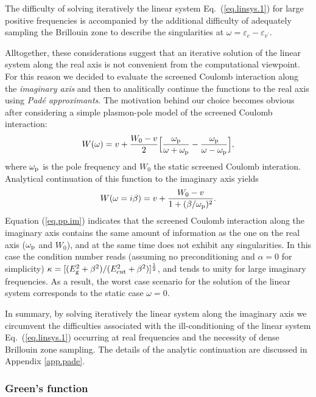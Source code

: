 \documentclass[twocolumn,prb,showpacs,superscriptaddress]{revtex4}
\def\w{\omega}
\def\E{\varepsilon}
\def\vp{{v^\prime}}
\begin{document}
The difficulty of solving iteratively the linear system Eq.\ (\ref{eq.linsys.1})
for large positive frequencies is accompanied by the additional difficulty 
of adequately sampling the Brillouin zone to describe the singularities at $\w = \E_c - \E_\vp$.

Alltogether, these considerations suggest that an iterative solution of the
linear system along the real axis is not convenient from the computational
viewpoint. For this reason we decided to evaluate the screened Coulomb interaction 
along the {\it imaginary axis} and then to analitically continue the functions
to the real axis using {\it Pad\'e approximants}.\cite{pade1,pade2,blochl}
The motivation behind our choice becomes obvious after considering a simple
plasmon-pole model of the screened Coulomb interaction:\cite{hl86}
  \begin{equation}
  W(\w) = v + \frac{W_0 -v}{2} \Big[ \frac{\w_{\rm p}}{\w+\w_{\rm p}} - \frac{\w_{\rm p}}{\w-\w_{\rm p}} \Big],
  \end{equation}
where $\w_{\rm p}$ is the pole frequency and $W_0$ the static screened Coulomb interation.
Analytical continuation of this function to the imaginary axis yields
  \begin{equation} \label{eq.pp.im}
  W(\w=i\beta) = v + \frac{W_0 -v}{1+(\beta/\w_{\rm p})^2}.
  \end{equation}
Equation (\ref{eq.pp.im}) indicates that the screened Coulomb interaction along the imaginary axis contains the same
amount of information as the one on the real axis ($\w_{\rm p}$ and $W_0$), and at the same time
does not exhibit any singularities. In this case the condition number reads
(assuming no preconditioning and $\alpha=0$ for simplicity) 
$\kappa=[(E_{\rm g}^2+\beta^2)/(E_{\rm cut}^2+\beta^2)]^\frac{1}{2}$,
and tends to unity for large imaginary frequencies.
As a result, the worst case scenario for the solution 
of the linear system corresponds to the static case $\w=0$.

In summary, by solving iteratively the linear system along the imaginary
axis we circumvent the difficulties associated with the ill-conditioning
of the linear system Eq.\ (\ref{eq.linsys.1}) occurring at real frequencies
and the necessity of dense Brillouin zone sampling.
The details of the analytic continuation are discussed in Appendix \ref{app.pade}.

\subsubsection{Green's function}
\end{document}
